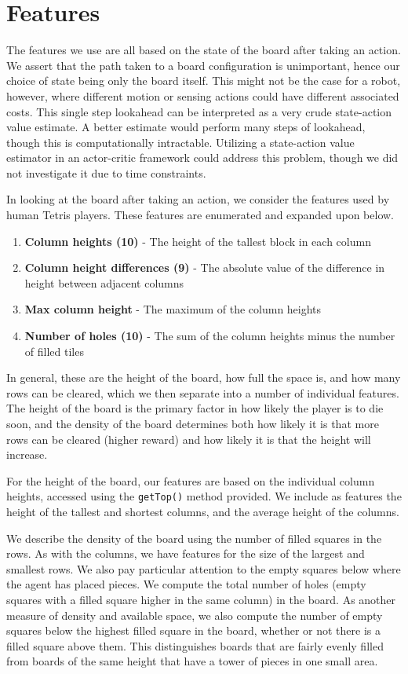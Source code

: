 \documentclass[11pt]{article}
\begin{document}
\section{Features}

The features we use are all based on the state of the board after taking an action. We assert that the path taken to a board configuration is unimportant, hence our choice of state being only the board itself. This might not be the case for a robot, however, where different motion or sensing actions could have different associated costs. This single step lookahead can be interpreted as a very crude state-action value estimate. A better estimate would perform many steps of lookahead, though this is computationally intractable. Utilizing a state-action value estimator in an actor-critic framework could address this problem, though we did not investigate it due to time constraints.

In looking at the board after taking an action, we consider the features used by human Tetris players.  These features are enumerated and expanded upon below.

\begin{enumerate}
	\item \textbf{Column heights (10)} - The height of the tallest block in each column
	\item \textbf{Column height differences (9)} - The absolute value of the difference in height between adjacent columns
	\item \textbf{Max column height} - The maximum of the column heights
	\item \textbf{Number of holes (10)} - The sum of the column heights minus the number of filled tiles
\end{enumerate}

In general, these are the height of the board, how full the space is, and how many rows can be cleared, which we then separate into a number of individual features.  The height of the board is the primary factor in how likely the player is to die soon, and the density of the board determines both how likely it is that more rows can be cleared (higher reward) and how likely it is that the height will increase.

For the height of the board, our features are based on the individual column heights, accessed using the \texttt{getTop()} method provided.  We include as features the height of the tallest and shortest columns, and the average height of the columns.

We describe the density of the board using the number of filled squares in the rows.  As with the columns, we have features for the size of the largest and smallest rows.  We also pay particular attention to the empty squares below where the agent has placed pieces.  We compute the total number of holes (empty squares with a filled square higher in the same column) in the board.  As another measure of density and available space, we also compute the number of empty squares below the highest filled square in the board, whether or not there is a filled square above them.  This distinguishes boards that are fairly evenly filled from boards of the same height that have a tower of pieces in one small area.
\end{document}

